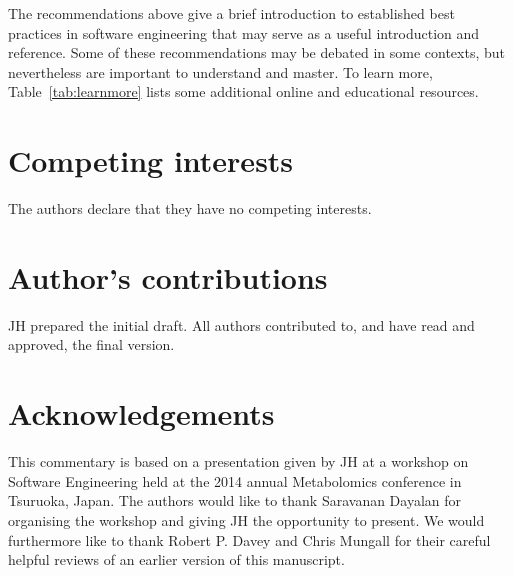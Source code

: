 \documentclass{bmcart}
\begin{document}
The recommendations above give a brief introduction to established best practices in software engineering that may serve as a useful introduction and reference. Some of these recommendations may be debated in some contexts, but nevertheless are important to understand and master. To learn more, Table~\ref{tab:learnmore} lists some additional online and educational resources. 


\begin{backmatter}

\section*{Competing interests}
  The authors declare that they have no competing interests.

\section*{Author's contributions}
  JH prepared the initial draft. All authors contributed to, and have read and approved, the final version. 

\section*{Acknowledgements}
  This commentary is based on a presentation given by JH at a workshop on Software Engineering held at the 2014 annual Metabolomics conference in Tsuruoka, Japan. The authors would like to thank Saravanan Dayalan for organising the workshop and giving JH the opportunity to present. We would furthermore like to thank Robert P. Davey and Chris Mungall for their careful helpful reviews of an earlier version of this manuscript. 


\end{backmatter}
\end{document}
